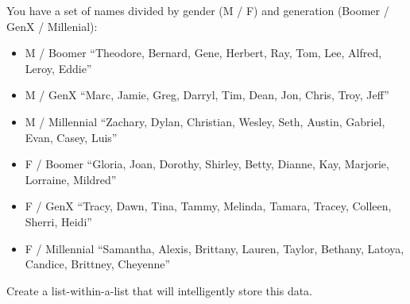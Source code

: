 \documentclass[
]{article}
\providecommand{\tightlist}{%
  \setlength{\itemsep}{0pt}\setlength{\parskip}{0pt}}
\begin{document}
You have a set of names divided by gender (M / F) and generation (Boomer
/ GenX / Millenial):

\begin{itemize}
\tightlist
\item
  M / Boomer ``Theodore, Bernard, Gene, Herbert, Ray, Tom, Lee, Alfred,
  Leroy, Eddie''
\item
  M / GenX ``Marc, Jamie, Greg, Darryl, Tim, Dean, Jon, Chris, Troy,
  Jeff''
\item
  M / Millennial ``Zachary, Dylan, Christian, Wesley, Seth, Austin,
  Gabriel, Evan, Casey, Luis''
\item
  F / Boomer ``Gloria, Joan, Dorothy, Shirley, Betty, Dianne, Kay,
  Marjorie, Lorraine, Mildred''
\item
  F / GenX ``Tracy, Dawn, Tina, Tammy, Melinda, Tamara, Tracey, Colleen,
  Sherri, Heidi''
\item
  F / Millennial ``Samantha, Alexis, Brittany, Lauren, Taylor, Bethany,
  Latoya, Candice, Brittney, Cheyenne''
\end{itemize}

Create a list-within-a-list that will intelligently store this data.
\end{document}
